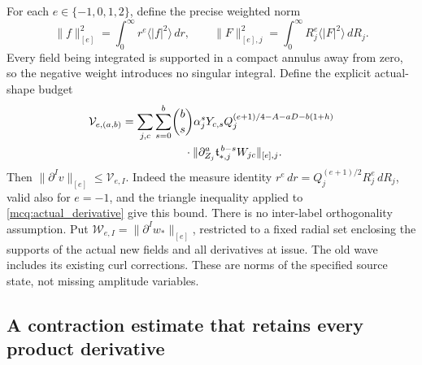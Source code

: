 \documentclass[11pt]{article}
\begin{document}
For each \(e\in\{-1,0,1,2\}\), define the precise weighted norm
\[
 \|f\|_{[e]}^2=\int_0^\infty r^e\langle |f|^2\rangle\,dr,\qquad
 \|F\|_{[e],j}^2=\int_0^\infty R_j^e\langle |F|^2\rangle\,dR_j.
\]
Every field being integrated is supported in a compact annulus away
from zero, so the negative weight introduces no singular integral.
Define the explicit actual-shape budget
\begin{equation}\label{mcq:V}
\begin{split}
 \mathcal V_{e,(a,b)}
 =\sum_{j,c}\sum_{s=0}^b&
 \binom bs \alpha_j^sY_{c,s}
 Q_j^{(e+1)/4-A-aD-b(1+h)}\\
 &\hspace{4mm}\cdot
 \|\partial_{Z_j}^a\mathfrak t_{*,j}^{\,b-s}W_{jc}\|_{[e],j}.
\end{split}
\end{equation}
Then \(\|\partial^I v\|_{[e]}\le\mathcal V_{e,I}\).
Indeed the measure identity
\(r^e\,dr=Q_j^{(e+1)/2}R_j^e\,dR_j\), valid also for \(e=-1\),
and the triangle inequality applied to \eqref{mcq:actual_derivative}
give this bound. There is no inter-label orthogonality assumption.
Put \(\mathcal W_{e,I}=\|\partial^I w_*\|_{[e]}\), restricted to a
fixed radial set enclosing the supports of the actual new fields
and all derivatives at issue. The old wave includes its existing curl
corrections. These are norms of the specified source state, not missing
amplitude variables.

\subsection{A contraction estimate that retains every product derivative}
\end{document}
